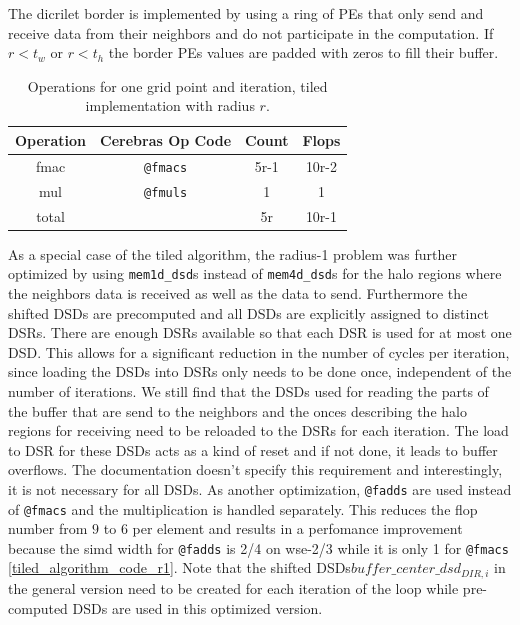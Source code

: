 \documentclass{article}
\begin{document}
The dicrilet border is implemented by using a ring of PEs that only send and receive data from their neighbors and do not participate in the computation. If $r<t_w$ or $r<t_h$ the border PEs values are padded with zeros to fill their buffer.

\begin{table}[h]
    \centering
    \begin{tabular}{|c|c|c|c|}
        \hline
        Operation & Cerebras Op Code & Count & Flops \\
        \hline
        fmac & \texttt{@fmacs} & 5r-1 & 10r-2 \\
        mul & \texttt{@fmuls} & 1 & 1 \\
        \hline
        total & & 5r & 10r-1 \\
        \hline
    \end{tabular}
    \caption{Operations for one grid point and iteration, tiled implementation with radius $r$.}
    \label{tab:tiled_operations}
\end{table}


As a special case of the tiled algorithm, the radius-1 problem was further optimized by using \texttt{mem1d\_dsd}s instead of \texttt{mem4d\_dsd}s for the halo regions where the neighbors data is received as well as the data to send. Furthermore the shifted DSDs are precomputed and all DSDs are explicitly assigned to distinct DSRs. There are enough DSRs available so that each DSR is used for at most one DSD. This allows for a significant reduction in the number of cycles per iteration, since loading the DSDs into DSRs only needs to be done once, independent of the number of iterations. We still find that the DSDs used for reading the parts of the buffer that are send to the neighbors and the onces describing the halo regions for receiving need to be reloaded to the DSRs for each iteration. The load to DSR for these DSDs acts as a kind of reset and if not done, it leads to buffer overflows. The documentation doesn't specify this requirement and interestingly, it is not necessary for all DSDs. 
As another optimization, \texttt{@fadds} are used instead of \texttt{@fmacs} and the multiplication is handled separately. This reduces the flop number from $9$ to $6$ per element and results in a perfomance improvement because the simd width for \texttt{@fadds} is 2/4 on wse-2/3 while it is only 1 for \texttt{@fmacs} \ref{tiled_algorithm_code_r1}. Note that the shifted DSDs$buffer\_center\_dsd_{DIR,i}$ in the general version need to be created for each iteration of the loop while pre-computed DSDs are used in this optimized version.
\end{document}
